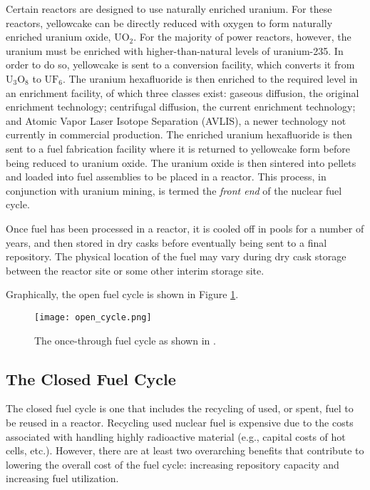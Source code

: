 Certain reactors are designed to use naturally enriched uranium. For these
reactors, yellowcake can be directly reduced with oxygen to form naturally
enriched uranium oxide, $\mathrm{UO_2}$. For the majority of power reactors,
however, the uranium must be enriched with higher-than-natural levels of
uranium-235. In order to do so, yellowcake is sent to a conversion facility,
which converts it from $\mathrm{U_3O_8}$ to $\mathrm{UF_6}$. The uranium
hexafluoride is then enriched to the required level in an enrichment facility,
of which three classes exist: gaseous diffusion, the original enrichment
technology; centrifugal diffusion, the current enrichment technology; and Atomic
Vapor Laser Isotope Separation (AVLIS), a newer technology not currently in
commercial production. The enriched uranium hexafluoride is then sent to a fuel
fabrication facility where it is returned to yellowcake form before being
reduced to uranium oxide. The uranium oxide is then sintered into pellets and
loaded into fuel assemblies to be placed in a reactor. This process, in
conjunction with uranium mining, is termed the \textit{front end} of the nuclear
fuel cycle.

Once fuel has been processed in a reactor, it is cooled off in pools for a
number of years, and then stored in dry casks before eventually being sent to a
final repository. The physical location of the fuel may vary during dry cask
storage between the reactor site or some other interim storage site.

Graphically, the open fuel cycle is shown in Figure \ref{fig:open-cycle}.

\begin{figure}[]
  \begin{center}
    \texttt{[image: open\_cycle.png]}
  \caption{The once-through fuel cycle as shown in \cite{cochran1990nuclear}.}
  \label{fig:open-cycle}
  \end{center}
\end{figure}

\subsection{The Closed Fuel Cycle}

The closed fuel cycle is one that includes the recycling of used, or spent, fuel
to be reused in a reactor. Recycling used nuclear fuel is expensive due to the
costs associated with handling highly radioactive material (e.g., capital costs
of hot cells, etc.). However, there are at least two overarching benefits that
contribute to lowering the overall cost of the fuel cycle: increasing repository
capacity and increasing fuel utilization.

